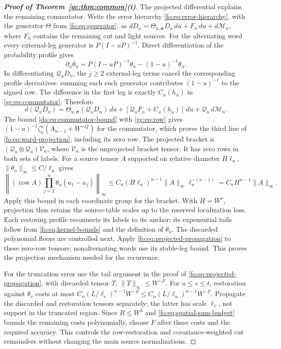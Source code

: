\documentclass[11pt]{article}
\numberwithin{equation}{section}
\theoremstyle{remark}
\newcommand{\cQ}{\mathcal Q}
\begin{document}
\begin{proof}[\textbf{Proof of Theorem~\ref{gc:thm:common}(i)}]
The projected differential explains the remaining commutator.
Write the error hierarchy \eqref{fo:eq:error-hierarchy}, with the
generator $\Theta$ from \eqref{fo:eq:generator}, as
$dD_n=\Theta_{u,\boldsymbol\sigma}D_n\,du+F_n\,du+d\mathcal M_n$,
where $F_n$ contains the remaining cut and light sources.
For the alternating word every external-leg generator is
$P(I-uP)^{-1}$. Direct differentiation of the probability profile gives
\[
 \partial_u\theta_u=P(I-uP)^{-1}\theta_u-(1-u)^{-1}\theta_u.
\]
In differentiating $\cQ_uD_n$, the $j\ge2$ external-leg terms cancel
the corresponding profile derivatives: summing each such generator
contributes $(1-u)^{-1}$ to the signed row. The difference in the first
leg is exactly $C_u(h_u)$ in \eqref{gc:eq:commutator}. Therefore
\begin{equation}\label{fo:eq:projected-error-equation}
 d(\cQ_uD_n)=\Theta_{u,\boldsymbol\sigma}(\cQ_uD_n)\,du
       +[\cQ_uF_n+C_u(h_u)]\,du+\cQ_u\,d\mathcal M_n.
\end{equation}
The bound \eqref{da:eq:commutator-bound} with \eqref{gc:eq:row}
gives $(1-u)^{-1}\zeta_u^n(A_{n-1}+W^{-Q})$ for the commutator,
which proves the third line of \eqref{fo:eq:ward-projection}, including
its zero row.
The projected bracket is
$(\cQ_u\otimes\cQ_u)\mathcal V_n$, where $\mathcal V_n$ is the
unprojected bracket tensor. It has zero rows in both sets of labels.
For a source tensor $A$ supported on relative diameter $H\ell_u$,
$\|\theta_u\|_\infty\le C/\ell_u$ gives
\[
 \left\|(\operatorname{row}A)\prod_{j=2}^n\theta_u(a_1-a_j)\right\|_\infty
 \le C_n(H\ell_u)^{n-1}\|A\|_\infty\ell_u^{-(n-1)}
 =C_nH^{n-1}\|A\|_\infty.
\]
Apply this bound in each coordinate group for the bracket.
With $H=W^\nu$, projection thus retains the source-table scales up to
the reserved localization loss. Each restoring profile reconnects its
labels to its anchor; its exponential tails follow from
\eqref{fo:eq:kernel-bounds} and the definition of $\theta_u$.
The discarded polynomial floors are controlled next.
Apply \eqref{fo:eq:projected-propagation} to these zero-row tensors;
nonalternating words use its stable-leg bound. This proves the
projection mechanism needed for the recurrence.

For the truncation error use the tail argument in the proof of
\eqref{fo:eq:projected-propagation}, with discarded tensor $T$,
$\|T\|_\infty\le W^{-F}$. For $u\le v\le t$, restoration against $\theta_v$ costs at most
$C_n(L/\ell_v)^{n-1}W^{-F}\le C_n(L/\ell_u)^{n-1}W^{-F}$.
Propagate the discarded and restoration tensors separately; the latter
has scale $\ell_v$, not support in the truncated region.
Since $R\le W^3$ and \eqref{fo:eq:spatial-sum-budget} bounds the remaining
costs polynomially, choose $F$ after these costs and the required accuracy.
This controls the row-restoration and covariance-weighted cut remainders
without changing the main source normalizations.


\end{proof}
\end{document}
